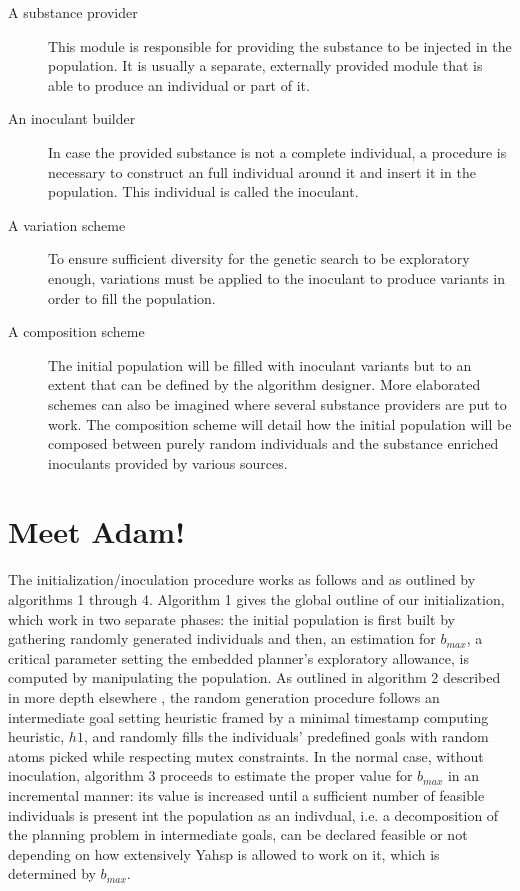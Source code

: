 \documentclass[english]{DESCARWINreport}
\begin{document}
\begin{description}

\item[A substance provider] 

This module is responsible for providing the substance to be injected in the population. It is usually a separate, externally provided module that is able to produce an individual or part of it.

\item[An inoculant builder] 

In case the provided substance is not a complete individual, a procedure is necessary to construct an full individual around it and insert it in the population. This individual is called the inoculant.

\item[A variation scheme] 

To ensure sufficient diversity for the genetic search to be exploratory enough, variations must be applied to the inoculant to produce variants in order to fill the population.


\item[A composition scheme] 

The initial population will be filled with inoculant variants but to an extent that can be defined by the algorithm designer. More elaborated schemes can also be imagined where several substance providers are put to work. The composition scheme will detail how the initial population will be composed between purely random individuals and the substance enriched inoculants provided by various sources.


\end{description}

\section{Meet Adam!}

The initialization/inoculation procedure works as follows and as outlined by algorithms 1 through 4. Algorithm 1 gives the global outline of our initialization, which work in two separate phases: the initial population is first built by gathering randomly generated individuals and then, an estimation for {$b_{max}$}, a critical parameter setting the embedded planner's exploratory allowance, is computed by manipulating the population. As outlined in algorithm 2 described in more depth elsewhere \cite{DBLP:conf/aips/BibaiSSV10}, the random generation procedure follows an intermediate goal setting heuristic framed by a minimal timestamp computing heuristic, {$h1$}, and randomly fills the individuals' predefined goals with random atoms picked while respecting mutex constraints. In the normal case, without inoculation, algorithm 3 proceeds to estimate the proper value for {$b_{max}$} in an incremental manner: its value is increased until a sufficient number of feasible individuals is present int the population as an indivdual, i.e. a decomposition of the planning problem in intermediate goals, can be declared feasible or not depending on how extensively Yahsp is allowed to work on it, which is determined by {$b_{max}$}.
\end{document}
